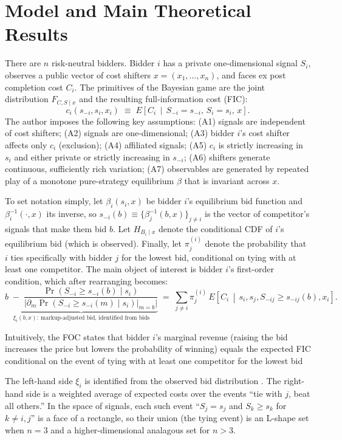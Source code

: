 \documentclass{article}
\begin{document}
\section{Model and Main Theoretical Results}
\label{section2}
There are $n$ risk-neutral bidders. Bidder $i$ has a private one-dimensional signal $S_i$, observes a public vector of cost shifters $x = (x_1,\dots,x_n)$, and faces ex post completion cost $C_i$. The primitives of the Bayesian game are the joint distribution $F_{C,S\mid x}$ and the resulting full-information cost (FIC):
\[
c_i(s_{-i}, s_i, x_i) \;\equiv\; E\!\left[C_i \,\middle|\, S_{-i}=s_{-i},\, S_i=s_i,\, x\right].
\]
The author imposes the following key assumptions: (A1) signals are independent of cost shifters; (A2) signals are one-dimensional; (A3) bidder $i$'s cost shifter affects only $c_i$ (exclusion); (A4) affiliated signals; (A5) $c_i$ is strictly increasing in $s_i$ and either private or strictly increasing in $s_{-i}$; (A6) shifters generate continuous, sufficiently rich variation; (A7) observables are generated by repeated play of a monotone pure-strategy equilibrium $\beta$ that is invariant across $x$.

To set notation simply, let $\beta_i(s_i, x)$ be bidder $i$'s equilibrium bid function and $\beta_i^{-1}(\cdot, x)$ its inverse, so $s_{-i}(b)\equiv\{\beta_j^{-1}(b,x)\}_{j\neq i}$ is the vector of competitor's signals that make them bid $b$. Let $H_{B_i\mid x}$ denote the conditional CDF of $i$'s equilibrium bid (which is observed). Finally, let $\pi_j^{(i)}$ denote the probability that $i$ ties specifically with bidder $j$ for the lowest bid, conditional on tying with at least one competitor. The main object of interest is bidder $i$'s first-order condition, which after rearranging \citep[eq.~5]{Somaini2020} becomes: 
\[
\underbrace{b \;-\; \frac{\Pr(S_{-i}\ge s_{-i}(b)\mid s_i)}{|\partial_m \Pr(S_{-i}\ge s_{-i}(m)\mid s_i)|_{m=b}|}}_{\xi_i(b,x):\ \text{markup-adjusted bid, identified from bids}}
\;=\; \sum_{j\neq i} \pi_j^{(i)} \, E\!\left[C_i \,\middle|\, s_i, s_j, S_{-ij}\ge s_{-ij}(b), x_i\right].
\]

Intuitively, the FOC states that bidder $i$'s marginal revenue (raising the bid increases the price but lowers the probability of winning) equals the expected FIC conditional on the event of tying with at least one competitor for the lowest bid

The left-hand side $\xi_i$ is identified from the observed bid distribution \citep[as in][]{GuerrePerrigneVuong2000,CampoPerrigneVuong2003}. The right-hand side is a weighted average of expected costs over the events ``tie with $j$, beat all others.'' In the space of signals, each such event ``$S_j=s_j$ and $S_k\ge s_k$ for $k\neq i,j$'' is a face of a rectangle, so their union (the tying event) is an L-shape set when $n=3$ and a higher-dimensional analagous set for $n>3$.
\end{document}
